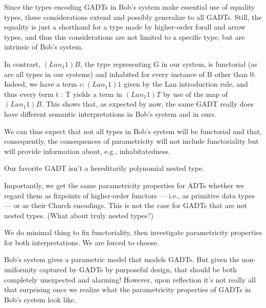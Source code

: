 \documentclass[acmsmall,screen,review,anonymous]{acmart}
\theoremstyle{definition}
\begin{document}
Since the types encoding GADTs in Bob's system make essential use
of equality types, these considerations extend and possibly generalize
to all GADTs.  Still, the equality is just a shorthand for a type made
by higher-order forall and arrow types, and thus this considerations
are not limited to a specific type, but are intrinsic of Bob's
system.

In contrast, $(Lan_1 1) B$, the type representing G in our system, is
functorial (as are all types in our systems) and inhabited for every
instance of B other than 0.  Indeed, we have a term $c : (Lan_1 1) 1$
given by the Lan introduction rule, and thus every term t : T yields a
term in $(Lan_1 1) T$ by use of the map of $(Lan_1 1) B$.  This shows
that, as expected by now, the same GADT really does have different
semantic interpretations in Bob's system and in ours.


We can thus expect that not all types in Bob's system will
be functorial and that, consequently, the consequences of
parametricity will not include functoriality but will provide
information about, e.g., inhabitatedness.


 
{\color{blue} Our favorite GADT isn't a hereditarily
  polynomial nested type.}





Importantly, we get the same parametricity properties for ADTs whether
we regard them as fixpoints of higher-order functors --- i.e., as
primitive data types --- or as their Church encodings. This is not the
case for GADTs that are not nested types. (What about truly nested
types?)

We do minimal thing to fix functoriality, then investigate
parametricity properties for both interpretations. We are forced to
choose. 

Bob's system gives a parametric model that models GADTs. But given the
non-uniformity captured by GADTs by purposeful design, that should be
both completely unexpected and alarming! However, upon reflection it's
not really all that surprising once we realize what the parametricity
properties of GADTs in Bob's system look like.

\end{document}
